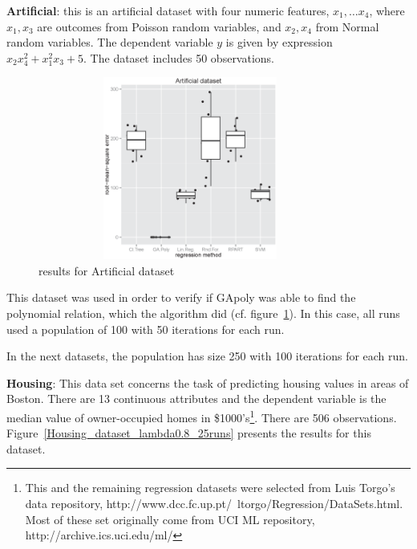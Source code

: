 \documentclass[a4paper, 12pt]{article}
\begin{document}
\textbf{Artificial}: this is an artificial dataset with four numeric features, $x_1, \ldots x_4$, where $x_1,x_3$ are outcomes from Poisson random variables, and $x_2,x_4$ from Normal random variables. The dependent variable $y$ is given by expression $x_2x_4^2 + x_1^2x_3 + 5$. The dataset includes 50 observations. 

\begin{figure}[htb]
	\begin{center}
		\includegraphics[height=6cm,width=10cm,angle=0]
			{figures/artificial_dataset1_lambda1.0.eps}
		\caption{results for Artificial dataset}
		\label{artificial_dataset1_lambda1.0}
	\end{center}
\end{figure}

This dataset was used in order to verify if GApoly was able to find the polynomial relation, which the algorithm did (cf. figure~\ref{artificial_dataset1_lambda1.0}). In this case, all runs used a population of 100 with 50 iterations for each run.

In the next datasets, the population has size 250 with 100 iterations for each run.

\textbf{Housing}: This data set concerns the task of predicting housing values in areas of Boston. There are 13 continuous attributes and the dependent variable is the median value of owner-occupied homes in \$1000's\footnote{This and the remaining regression datasets were selected from Luis Torgo's data repository, http://www.dcc.fc.up.pt/~ltorgo/Regression/DataSets.html. Most of these set originally come from UCI ML repository, http://archive.ics.uci.edu/ml/}. There are 506 observations. Figure~\ref{Housing_dataset_lambda0.8_25runs} presents the results for this dataset.
\end{document}
